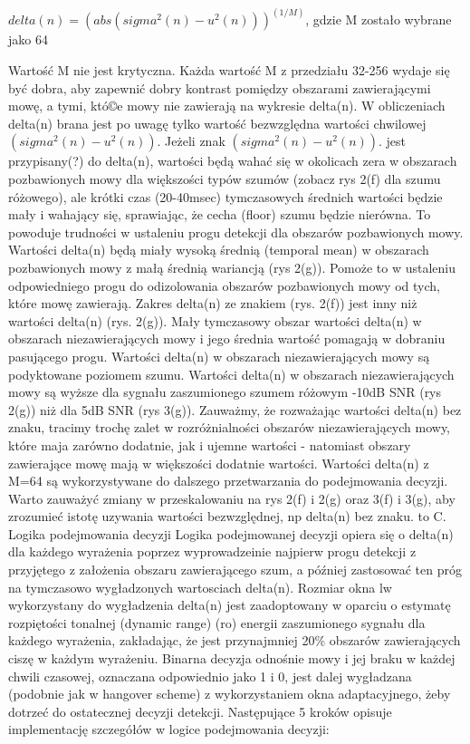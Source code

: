 \documentclass[eng,printmode]{mgr}
\begin{document}
 $delta(n) = (abs(sigma^2(n)-u^2(n)))^(1/M)$, gdzie M zostało wybrane jako 64
 
 Wartość M nie jest krytyczna. Każda wartość M z przedziału 32-256 wydaje się być dobra, aby zapewnić dobry kontrast pomiędzy obszarami zawierającymi mowę, a tymi, któ©e mowy nie zawierają na wykresie delta(n). W obliczeniach delta(n) brana jest po uwagę tylko wartość bezwzględna wartości chwilowej $(sigma^2(n) - u^2(n))$. Jeżeli znak $(sigma^2(n) - u^2(n))$. jest przypisany(?) do delta(n), wartości będą wahać się w okolicach zera w obszarach pozbawionych mowy 
 dla większości typów szumów (zobacz rys 2(f) dla szumu różowego), ale krótki czas (20-40msec) tymczasowych średnich wartości będzie mały i wahający się, sprawiając, że cecha (floor) szumu będzie nierówna. To powoduje trudności w ustaleniu progu detekcji dla obszarów pozbawionych mowy. Wartości delta(n) będą miały wysoką średnią (temporal mean) w obszarach pozbawionych mowy z małą średnią wariancją (rys 2(g)). Pomoże to w ustaleniu odpowiedniego progu do odizolowania obszarów pozbawionych mowy od tych, które mowę zawierają. Zakres delta(n) ze znakiem (rys. 2(f)) jest inny niż wartości delta(n) (rys. 2(g)). Mały tymczasowy obszar wartości delta(n) w obszarach niezawierających  mowy i jego średnia wartość pomagają w dobraniu pasującego progu. Wartości delta(n) w obszarach niezawierających mowy są podyktowane poziomem szumu. Wartości delta(n) w obszarach niezawierających mowy są wyższe dla sygnału zaszumionego szumem różowym -10dB SNR (rys 2(g)) niż dla 5dB SNR (rys 3(g)). Zauważmy, że rozważając wartości  delta(n) bez znaku, tracimy trochę zalet w rozróżnialności obszarów niezawierających mowy, które maja zarówno dodatnie, jak i ujemne wartości - natomiast obszary zawierające mowę mają w większości dodatnie wartości. Wartości delta(n) z M=64 są wykorzystywane do dalszego przetwarzania do podejmowania decyzji. Warto zauważyć zmiany w przeskalowaniu na rys 2(f) i 2(g) oraz 3(f) i 3(g), aby zrozumieć istotę uzywania wartości bezwzględnej, np delta(n) bez znaku.
 to
 C. Logika podejmowania decyzji
  Logika podejmowanej decyzji opiera się o delta(n) dla każdego wyrażenia poprzez wyprowadzeinie najpierw progu detekcji z przyjętego z założenia obszaru zawierającego szum, a później zastosować ten próg na tymczasowo wygładzonych wartosciach delta(n). Rozmiar okna lw wykorzystany do wygładzenia delta(n) jest zaadoptowany w oparciu o estymatę rozpiętości tonalnej (dynamic range) (ro) energii zaszumionego sygnału dla każdego wyrażenia, zakładając, że jest przynajmniej 20\% obszarów zawierających ciszę w każdym wyrażeniu. Binarna decyzja odnośnie mowy i jej braku w każdej chwili czasowej, oznaczana odpowiednio jako 1 i 0, jest dalej wygładzana (podobnie jak w hangover scheme) z wykorzystaniem okna adaptacyjnego, żeby dotrzeć do ostatecznej decyzji detekcji. Następujące 5 kroków opisuje implementację szczegółów w logice podejmowania decyzji:
  
\end{document}

